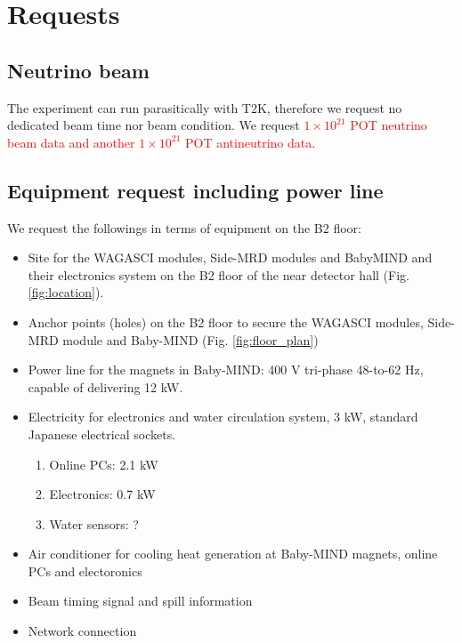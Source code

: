 \section{Requests}

\subsection{Neutrino beam}
The experiment can run parasitically with T2K, therefore we request no dedicated beam time nor beam condition.
We request \textcolor{red}{$1 \times 10^{21}$ POT neutrino beam data and another $1 \times 10^{21}$ POT antineutrino data}.

\subsection{Equipment request including power line}
We request the followings in terms of equipment on the B2 floor:
\begin{itemize}
\item Site for the WAGASCI modules, Side-MRD modules and BabyMIND and their electronics system on the B2 floor of the near detector hall (Fig. \ref{fig:location}).
\item Anchor points (holes) on the B2 floor to secure the WAGASCI modules, Side-MRD module and Baby-MIND (Fig. \ref{fig:floor_plan})
\item Power line for the magnets in Baby-MIND: 400 V tri-phase 48-to-62 Hz, capable of delivering 12 kW.
\item Electricity for electronics and water circulation system, 3 kW, standard Japanese electrical sockets.
	\begin{enumerate}
		\item Online PCs: 2.1 kW
		\item Electronics: 0.7 kW
		\item Water sensors: ?
	\end{enumerate}
\item Air conditioner for cooling heat generation at Baby-MIND magnets, online PCs and electoronics
\item Beam timing signal and spill information
\item Network connection
\end{itemize}



